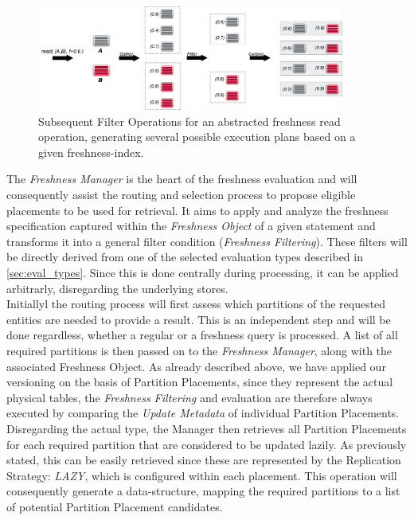 \begin{figure}[t] 
    \centering 
    \includegraphics[width=0.9\textwidth]{Figures/filter.png}
    \caption{Subsequent Filter Operations for an abstracted freshness read operation, generating several possible execution plans based on a given freshness-index.}
    \label{fig:filter}
\end{figure}

The \emph{Freshness Manager} is the heart of the freshness evaluation and will consequently assist the routing and selection process to propose eligible placements
to be used for retrieval. 
It aims to apply and analyze the freshness specification captured within the \emph{Freshness Object} of a given statement and transforms it 
into a general filter condition (\emph{Freshness Filtering}). These filters will be directly derived from one of the selected evaluation types described in \ref{sec:eval_types}.
Since this is done centrally during processing, it can be applied arbitrarly, disregarding the underlying stores.\\
Initiallyl the routing process will first assess which partitions of the requested entities are needed to provide a result.
This is an independent step and will be done regardless, whether a regular or a freshness query is processed. 
A list of all required partitions is then passed on to the \emph{Freshness Manager}, along with the associated Freshness Object. 
As already described above, we have applied our versioning on the basis of Partition Placements, since they represent the actual physical tables,
the \emph{Freshness Filtering} and evaluation are therefore always executed by comparing the \emph{Update Metadata} of individual Partition Placements. 
Disregarding the actual type, the Manager then retrieves all Partition Placements for each required partition that are considered to be updated lazily.
As previously stated, this can be easily retrieved since these are represented by the Replication Strategy: \emph{LAZY}, which is configured within each placement. 
This operation will consequently generate a data-structure, mapping the required partitions to a list of potential Partition Placement candidates.

